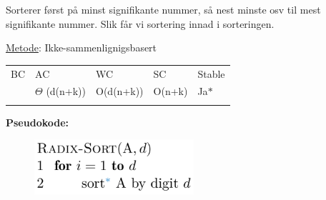 \documentclass[12pt]{report}
\begin{document}
Sorterer først på minst signifikante nummer, så nest minste osv til mest signifikante nummer. Slik får vi sortering innad i sorteringen.\par

\uline{Metode}: Ikke-sammenlignigsbasert\par





\begin{table}[H]
 			\centering
\begin{tabular}{p{1.33in}p{1.32in}p{1.32in}p{0.97in}p{0.72in}}
\hline
\multicolumn{1}{p{1.33in}}{{\fontsize{13pt}{15.6pt}\selectfont BC}} & 
\multicolumn{1}{p{1.32in}}{{\fontsize{13pt}{15.6pt}\selectfont AC}} & 
\multicolumn{1}{p{1.32in}}{{\fontsize{13pt}{15.6pt}\selectfont WC}} & 
\multicolumn{1}{p{0.97in}}{{\fontsize{13pt}{15.6pt}\selectfont SC}} & 
\multicolumn{1}{p{0.72in}}{{\fontsize{13pt}{15.6pt}\selectfont Stable}} \\
\hhline{-----}
\multicolumn{1}{p{1.33in}}{{\fontsize{14pt}{16.8pt}\selectfont $ \Omega $ (d(n+k))}} & 
\multicolumn{1}{p{1.32in}}{{\fontsize{14pt}{16.8pt}\selectfont $ \Theta $ (d(n+k))}} & 
\multicolumn{1}{p{1.32in}}{{\fontsize{14pt}{16.8pt}\selectfont O(d(n+k))}} & 
\multicolumn{1}{p{0.97in}}{{\fontsize{14pt}{16.8pt}\selectfont O(n+k)}} & 
\multicolumn{1}{p{0.72in}}{{\fontsize{13pt}{15.6pt}\selectfont Ja$\ast$ }} \\
\hhline{-----}

\end{tabular}
 \end{table}




\vspace{\baselineskip}
\textbf{Pseudokode:}\par




\begin{figure}[H]
	\begin{Center}
		\includegraphics[width=2.32in,height=0.8in]{./media/image37.png}
	\end{Center}
\end{figure}
\end{document}
